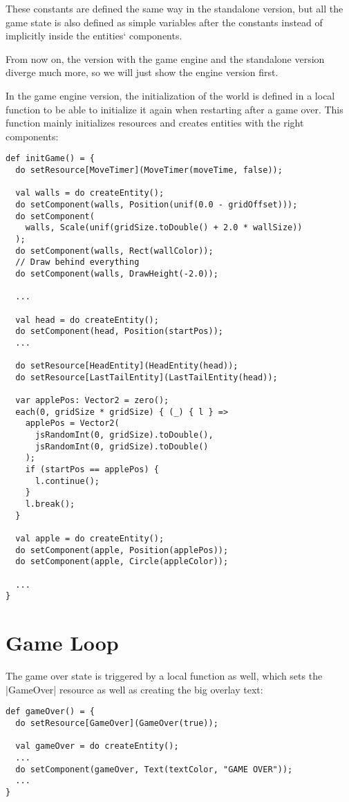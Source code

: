 These constants are defined the same way in the standalone version, but all the game state is also defined as simple variables after the constants instead of implicitly inside the entities` components.

From now on, the version with the game engine and the standalone version diverge much more, so we will just show the engine version first.

In the game engine version, the initialization of the world is defined in a local function to be able to initialize it again when restarting after a game over. This function mainly initializes resources and creates entities with the right components:

\begin{lstlisting}
def initGame() = {
  do setResource[MoveTimer](MoveTimer(moveTime, false));

  val walls = do createEntity();
  do setComponent(walls, Position(unif(0.0 - gridOffset)));
  do setComponent(
	walls, Scale(unif(gridSize.toDouble() + 2.0 * wallSize))
  );
  do setComponent(walls, Rect(wallColor));
  // Draw behind everything
  do setComponent(walls, DrawHeight(-2.0));

  ...

  val head = do createEntity();
  do setComponent(head, Position(startPos));
  ...

  do setResource[HeadEntity](HeadEntity(head));
  do setResource[LastTailEntity](LastTailEntity(head));

  var applePos: Vector2 = zero();
  each(0, gridSize * gridSize) { (_) { l } =>
    applePos = Vector2(
	  jsRandomInt(0, gridSize).toDouble(),
	  jsRandomInt(0, gridSize).toDouble()
	);
    if (startPos == applePos) {
      l.continue();
    }
    l.break();
  }

  val apple = do createEntity();
  do setComponent(apple, Position(applePos));
  do setComponent(apple, Circle(appleColor));

  ...
}
\end{lstlisting}

\section{Game Loop}

The game over state is triggered by a local function as well, which sets the |GameOver| resource as well as creating the big overlay text:

\begin{lstlisting}
def gameOver() = {
  do setResource[GameOver](GameOver(true));

  val gameOver = do createEntity();
  ...
  do setComponent(gameOver, Text(textColor, "GAME OVER"));
  ...
}
\end{lstlisting}

